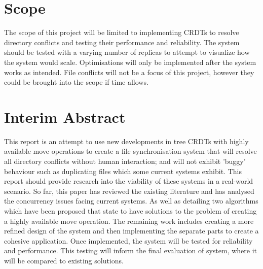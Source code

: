 \documentclass[12pt]{report}
\begin{document}
\section{Scope}
The scope of this project will be limited to implementing CRDTs to resolve directory conflicts and
testing their performance and reliability. The system should be tested with a varying number of
replicas to attempt to visualize how the system would scale. Optimisations will only be
implemented after the system works as intended.
File conflicts will not be a focus of this project, however they could be brought into the scope if
time allows.

\section{Interim Abstract}
This report is an attempt to use new developments in tree CRDTs with
highly available move operations to create a file synchronisation system that
will resolve all directory conflicts without human interaction; and will not
exhibit ’buggy’ behaviour such as duplicating files which some current systems exhibit. This report should provide research into the viability of these
systems in a real-world scenario. So far, this paper has reviewed the existing
literature and has analysed the concurrency issues facing current systems. As
well as detailing two algorithms which have been proposed that state to have
solutions to the problem of creating a highly available move operation.
The remaining work includes creating a more refined design of the system and
then implementing the separate parts to create a cohesive application. Once
implemented, the system will be tested for reliability and performance. This
testing will inform the final evaluation of system, where it will be compared
to existing solutions.


\end{document}
